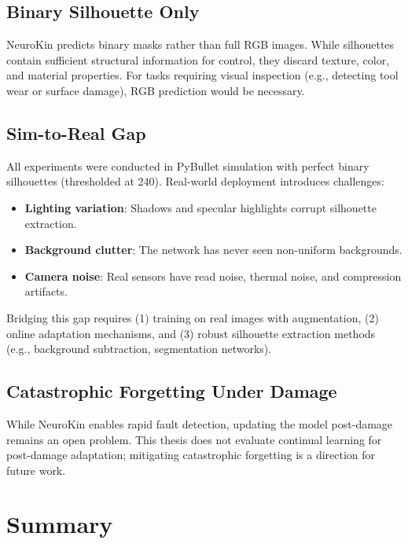 \documentclass[12pt,a4paper,oneside]{report}
\begin{document}
\subsection{Binary Silhouette Only}
\label{subsec:binary_silhouette_only}

NeuroKin predicts binary masks rather than full RGB images. While silhouettes contain sufficient structural information for control, they discard texture, color, and material properties. For tasks requiring visual inspection (e.g., detecting tool wear or surface damage), RGB prediction would be necessary.

\subsection{Sim-to-Real Gap}
\label{subsec:sim_to_real_gap}

All experiments were conducted in PyBullet simulation with perfect binary silhouettes (thresholded at 240). Real-world deployment introduces challenges:

\begin{itemize}
    \item \textbf{Lighting variation}: Shadows and specular highlights corrupt silhouette extraction.
    \item \textbf{Background clutter}: The network has never seen non-uniform backgrounds.
    \item \textbf{Camera noise}: Real sensors have read noise, thermal noise, and compression artifacts.
\end{itemize}

Bridging this gap requires (1) training on real images with augmentation, (2) online adaptation mechanisms, and (3) robust silhouette extraction methods (e.g., background subtraction, segmentation networks).

\subsection{Catastrophic Forgetting Under Damage}
\label{subsec:catastrophic_forgetting_under_damage}

While NeuroKin enables rapid fault detection, updating the model post-damage remains an open problem. This thesis does not evaluate continual learning for post-damage adaptation; mitigating catastrophic forgetting is a direction for future work.

\section{Summary}
\end{document}
